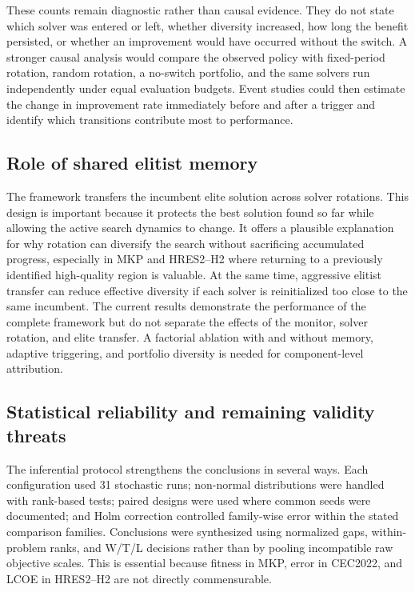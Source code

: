 These counts remain diagnostic rather than causal evidence. They do not state
which solver was entered or left, whether diversity increased, how long the
benefit persisted, or whether an improvement would have occurred without the
switch. A stronger causal analysis would compare the observed policy with
fixed-period rotation, random rotation, a no-switch portfolio, and the same
solvers run independently under equal evaluation budgets. Event studies could
then estimate the change in improvement rate immediately before and after a
trigger and identify which transitions contribute most to performance.

\subsection{Role of shared elitist memory}
\label{sec:discussion-memory}

The framework transfers the incumbent elite solution across solver rotations.
This design is important because it protects the best solution found so far
while allowing the active search dynamics to change. It offers a plausible
explanation for why rotation can diversify the search without sacrificing
accumulated progress, especially in MKP and HRES2--H2 where returning to a
previously identified high-quality region is valuable. At the same time,
aggressive elitist transfer can reduce effective diversity if each solver is
reinitialized too close to the same incumbent. The current results demonstrate
the performance of the complete framework but do not separate the effects of
the monitor, solver rotation, and elite transfer. A factorial ablation with and
without memory, adaptive triggering, and portfolio diversity is needed for
component-level attribution.

\subsection{Statistical reliability and remaining validity threats}
\label{sec:discussion-validity}

The inferential protocol strengthens the conclusions in several ways. Each
configuration used 31 stochastic runs; non-normal distributions were handled
with rank-based tests; paired designs were used where common seeds were
documented; and Holm correction controlled family-wise error within the stated
comparison families. Conclusions were synthesized using normalized gaps,
within-problem ranks, and W/T/L decisions rather than by pooling incompatible
raw objective scales. This is essential because fitness in MKP, error in
CEC2022, and LCOE in HRES2--H2 are not directly commensurable.

